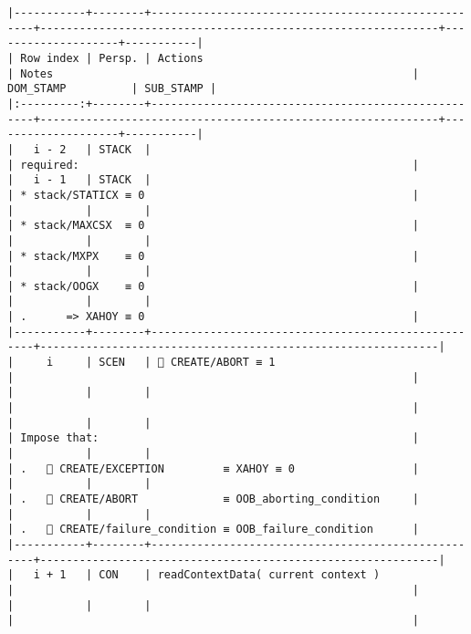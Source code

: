 \documentclass[varwidth=\maxdimen,margin=0.5cm,multi={verbatim}]{standalone}
\begin{document}
\begin{verbatim}
|-----------+--------+----------------------------------------------------+-------------------------------------------------------------+--------------------+-----------|
| Row index | Persp. | Actions                                            | Notes                                                       | DOM_STAMP          | SUB_STAMP |
|:---------:+--------+----------------------------------------------------+-------------------------------------------------------------+--------------------+-----------|
|   i - 2   | STACK  |                                                    | required:                                                   |
|   i - 1   | STACK  |                                                    | * stack/STATICX ≡ 0                                         |
|           |        |                                                    | * stack/MAXCSX  ≡ 0                                         |
|           |        |                                                    | * stack/MXPX    ≡ 0                                         |
|           |        |                                                    | * stack/OOGX    ≡ 0                                         |
|           |        |                                                    | .      => XAHOY ≡ 0                                         |
|-----------+--------+----------------------------------------------------+-------------------------------------------------------------|
|     i     | SCEN   |  CREATE/ABORT ≡ 1                                 |                                                             |
|           |        |                                                    |                                                             |
|           |        |                                                    | Impose that:                                                |
|           |        |                                                    | .    CREATE/EXCEPTION         ≡ XAHOY ≡ 0                  |
|           |        |                                                    | .    CREATE/ABORT             ≡ OOB_aborting_condition     |
|           |        |                                                    | .    CREATE/failure_condition ≡ OOB_failure_condition      |
|-----------+--------+----------------------------------------------------+-------------------------------------------------------------|
|   i + 1   | CON    | readContextData( current context )                 |                                                             |
|           |        |                                                    |                                                             |

\end{verbatim}
\end{document}
